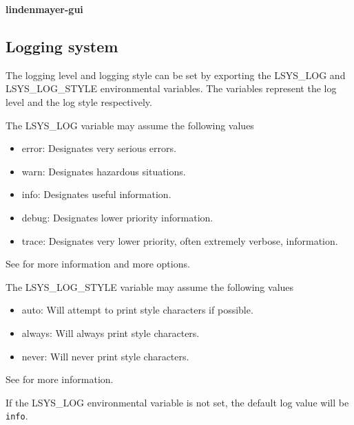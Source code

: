 \documentclass[a4paper]{article}
\begin{document}
\textbf{lindenmayer-gui}

\pagebreak

\subsection{Logging system}

The logging level and logging style can be set
by exporting the \colorbox{gray!10}{LSYS\_LOG} and \\
\colorbox{gray!10}{LSYS\_LOG\_STYLE}
environmental variables. The variables represent the log level
and the log style respectively.

The \colorbox{gray!10}{LSYS\_LOG} variable may assume the following values
\begin{itemize}
    \item \colorbox{gray!10}{error}: Designates very serious errors.
    \item \colorbox{gray!10}{warn}: Designates hazardous situations.
    \item \colorbox{gray!10}{info}: Designates useful information.
    \item \colorbox{gray!10}{debug}: Designates lower priority information.
    \item \colorbox{gray!10}{trace}: Designates very lower priority, often extremely verbose, information.
\end{itemize}
See \cite{envlogginglvl} for more information and more options.

The \colorbox{gray!10}{LSYS\_LOG\_STYLE} variable may assume the following values
\begin{itemize}
    \item \colorbox{gray!10}{auto}: Will attempt to print style characters if possible.
    \item \colorbox{gray!10}{always}: Will always print style characters.
    \item \colorbox{gray!10}{never}: Will never print style characters.
\end{itemize}
See \cite{envloggingstyle} for more information.

If the \colorbox{gray!10}{LSYS\_LOG} environmental variable is not set,
the default log value will be \texttt{info}.
\end{document}
